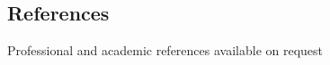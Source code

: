 \documentclass[margin,line]{resume}
\begin{document}
\begin{resume}
    \section{\mysidestyle References} 
    {Professional and academic references available on request}

\end{resume}
\end{document}
